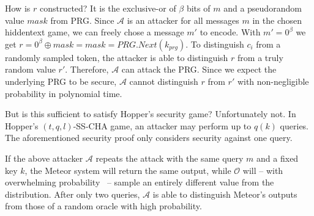 How is $r$ constructed? 
It is the exclusive-or of $\beta$ bits of $m$ and a pseudorandom value $mask$ from PRG.
Since $\mathcal{A}$ is an attacker for all messages $m$ in the chosen hiddentext game, we can freely chose a message $m'$ to encode.
With $m' = 0^\beta$ we get $r = 0^\beta \oplus mask = mask = PRG.Next(k_{prg})$.
To distinguish $c_i$ from a randomly sampled token, the attacker is able to distinguish $r$ from a truly random value $r'$.
Therefore, $\mathcal{A}$ can attack the PRG.
Since we expect the underlying PRG to be secure, $\mathcal{A}$ cannot distinguish $r$ from $r'$ with non-negligible probability in polynomial time.

But is this sufficient to satisfy Hopper's security game?
Unfortunately not.
In Hopper's $(t,q,l)$-SS-CHA game, an attacker may perform up to $q(k)$ queries.
The aforementioned security proof only considers security against one query.

If the above attacker $\mathcal{A}$ repeats the attack with the same query $m$ and a fixed key $k$, the Meteor system will return the same output, while $\mathcal{O}$ will -- with overwhelming probability~ -- sample an entirely different value from the distribution.
After only two queries, $\mathcal{A}$ is able to distinguish Meteor's outputs from those of a random oracle with high probability.